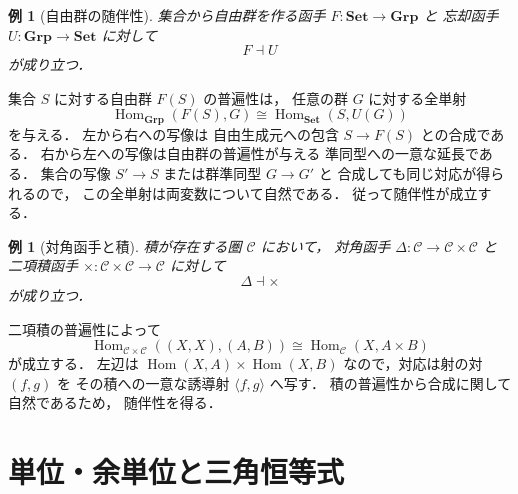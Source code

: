 \documentclass[a5paper,10pt,onecolumn]{jsarticle}
\makeatletter
\theoremstyle{mathnotetheorem}
\newtheorem{example}[theorem]{例}
\renewcommand{\proofname}{証明}
\renewenvironment{proof}[1][\proofname]{%
  \par\pushQED{\qed}\normalfont\topsep4\p@\@plus2\p@\relax
  \trivlist\item[\hskip\labelsep\bfseries #1]\ignorespaces
}{\popQED\endtrivlist\@endpefalse}
\makeatother
\begin{document}
\begin{example}[自由群の随伴性]\label{ex:free-group}
集合から自由群を作る函手
$F:\mathbf{Set}\to\mathbf{Grp}$ と
忘却函手 $U:\mathbf{Grp}\to\mathbf{Set}$ に対して
\[
 F\dashv U
\]
が成り立つ．
\end{example}
\begin{proof}
集合 $S$ に対する自由群 $F(S)$ の普遍性は，
任意の群 $G$ に対する全単射
\[
 \operatorname{Hom}_{\mathbf{Grp}}(F(S),G)
 \cong\operatorname{Hom}_{\mathbf{Set}}(S,U(G))
\]
を与える．
左から右への写像は
自由生成元への包含 $S\to F(S)$ との合成である．
右から左への写像は自由群の普遍性が与える
準同型への一意な延長である．
集合の写像 $S'\to S$ または群準同型 $G\to G'$ と
合成しても同じ対応が得られるので，
この全単射は両変数について自然である．
従って随伴性が成立する．
\end{proof}

\begin{example}[対角函手と積]
積が存在する圏 $\mathcal C$ において，
対角函手 $\Delta:\mathcal C\to\mathcal C\times\mathcal C$ と
二項積函手
$\times:\mathcal C\times\mathcal C\to\mathcal C$
に対して
\[
 \Delta\dashv\times
\]
が成り立つ．
\end{example}
\begin{proof}
二項積の普遍性によって
\[
 \operatorname{Hom}_{\mathcal C\times\mathcal C}
 ((X,X),(A,B))
 \cong
 \operatorname{Hom}_{\mathcal C}(X,A\times B)
\]
が成立する．
左辺は
$\operatorname{Hom}(X,A)\times\operatorname{Hom}(X,B)$
なので，対応は射の対 $(f,g)$ を
その積への一意な誘導射 $\langle f,g\rangle$ へ写す．
積の普遍性から合成に関して自然であるため，
随伴性を得る．
\end{proof}

\section{単位・余単位と三角恒等式}
\end{document}
